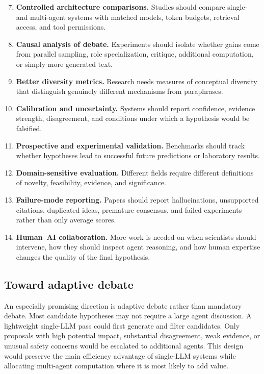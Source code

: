 \documentclass[11pt]{article}
\begin{document}
\begin{enumerate}
  \setcounter{enumi}{6}
  \item \textbf{Controlled architecture comparisons.} Studies should compare single- and multi-agent
  systems with matched models, token budgets, retrieval access, and tool permissions.

  \item \textbf{Causal analysis of debate.} Experiments should isolate whether gains come from parallel
  sampling, role specialization, critique, additional computation, or simply more generated text.

  \item \textbf{Better diversity metrics.} Research needs measures of conceptual diversity that distinguish
  genuinely different mechanisms from paraphrases.

  \item \textbf{Calibration and uncertainty.} Systems should report confidence, evidence strength,
  disagreement, and conditions under which a hypothesis would be falsified.

  \item \textbf{Prospective and experimental validation.} Benchmarks should track whether hypotheses
  lead to successful future predictions or laboratory results.

  \item \textbf{Domain-sensitive evaluation.} Different fields require different definitions of novelty,
  feasibility, evidence, and significance.

  \item \textbf{Failure-mode reporting.} Papers should report hallucinations, unsupported citations,
  duplicated ideas, premature consensus, and failed experiments rather than only average scores.

  \item \textbf{Human--AI collaboration.} More work is needed on when scientists should intervene, how
  they should inspect agent reasoning, and how human expertise changes the quality of the final
  hypothesis.
\end{enumerate}

\subsection{Toward adaptive debate}
\label{subsec:adaptive-debate}

An especially promising direction is adaptive debate rather than mandatory debate. Most candidate
hypotheses may not require a large agent discussion. A lightweight single-LLM pass could first
generate and filter candidates. Only proposals with high potential impact, substantial disagreement,
weak evidence, or unusual safety concerns would be escalated to additional agents. This design
would preserve the main efficiency advantage of single-LLM systems while allocating multi-agent
computation where it is most likely to add value.
\end{document}

